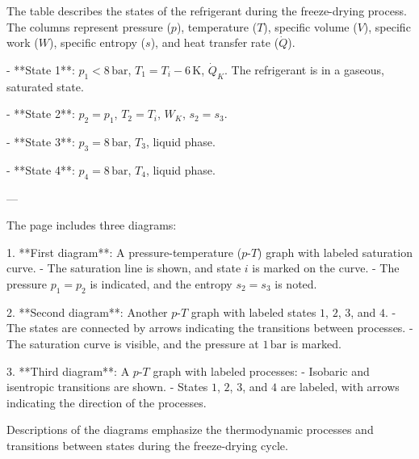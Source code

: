 The table describes the states of the refrigerant during the freeze-drying process. The columns represent pressure (\(p\)), temperature (\(T\)), specific volume (\(V\)), specific work (\(W\)), specific entropy (\(s\)), and heat transfer rate (\(\dot{Q}\)).  

- **State 1**:  
  \( p_1 < 8 \, \text{bar} \), \( T_1 = T_i - 6 \, \text{K} \), \( \dot{Q}_K \).  
  The refrigerant is in a gaseous, saturated state.  

- **State 2**:  
  \( p_2 = p_1 \), \( T_2 = T_i \), \( W_K \), \( s_2 = s_3 \).  

- **State 3**:  
  \( p_3 = 8 \, \text{bar} \), \( T_3 \), liquid phase.  

- **State 4**:  
  \( p_4 = 8 \, \text{bar} \), \( T_4 \), liquid phase.  

---

The page includes three diagrams:  

1. **First diagram**:  
   A pressure-temperature (\(p\)-\(T\)) graph with labeled saturation curve.  
   - The saturation line is shown, and state \(i\) is marked on the curve.  
   - The pressure \(p_1 = p_2\) is indicated, and the entropy \(s_2 = s_3\) is noted.  

2. **Second diagram**:  
   Another \(p\)-\(T\) graph with labeled states \(1\), \(2\), \(3\), and \(4\).  
   - The states are connected by arrows indicating the transitions between processes.  
   - The saturation curve is visible, and the pressure at \(1 \, \text{bar}\) is marked.  

3. **Third diagram**:  
   A \(p\)-\(T\) graph with labeled processes:  
   - Isobaric and isentropic transitions are shown.  
   - States \(1\), \(2\), \(3\), and \(4\) are labeled, with arrows indicating the direction of the processes.  

Descriptions of the diagrams emphasize the thermodynamic processes and transitions between states during the freeze-drying cycle.